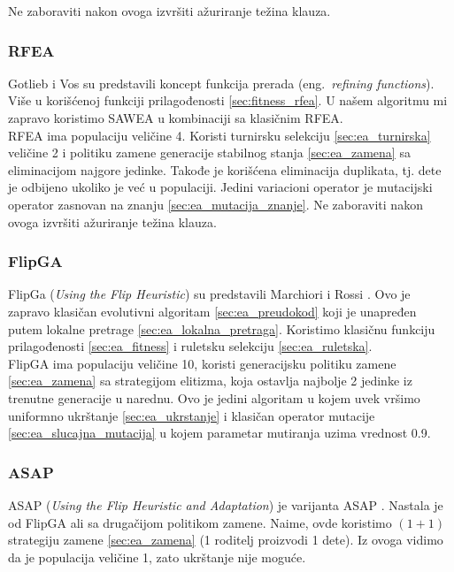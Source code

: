 \documentclass{article}
\begin{document}
Ne zaboraviti nakon ovoga izvršiti ažuriranje težina klauza.


\subsubsection{RFEA}
\label{sec:ea_rfea}
Gotlieb i Vos \cite{ea_with_table, ea_without_table} su predstavili koncept funkcija prerada (eng.~{\em refining functions}). Više u korišćenoj funkciji prilagođenosti \ref{sec:fitness_rfea}.
U našem algoritmu mi zapravo koristimo SAWEA u kombinaciji sa klasičnim RFEA. \\

RFEA ima populaciju veličine 4. Koristi turnirsku selekciju \ref{sec:ea_turnirska} veličine 2 i politiku zamene generacije stabilnog stanja \ref{sec:ea_zamena} sa eliminacijom najgore jedinke. Takođe je korišćena eliminacija duplikata, tj. dete je odbijeno ukoliko je već u populaciji.
Jedini variacioni operator je mutacijski operator zasnovan na znanju \ref{sec:ea_mutacija_znanje}.
Ne zaboraviti nakon ovoga izvršiti ažuriranje težina klauza.


\subsubsection{FlipGA}
\label{sec:ea_flipga}
FlipGa (\textit{Using the Flip Heuristic}) su predstavili Marchiori i Rossi \cite{ea_with_table}. Ovo je zapravo klasičan evolutivni algoritam \ref{sec:ea_preudokod}  koji je unapređen putem lokalne pretrage \ref{sec:ea_lokalna_pretraga}. Koristimo klasičnu funkciju prilagođenosti \ref{sec:ea_fitness} i ruletsku selekciju \ref{sec:ea_ruletska}. \\

FlipGA ima populaciju veličine 10, koristi generacijsku politiku zamene \ref{sec:ea_zamena} sa strategijom elitizma, koja ostavlja najbolje 2 jedinke iz trenutne generacije u narednu.	Ovo je jedini algoritam u kojem uvek vršimo uniformno ukrštanje \ref{sec:ea_ukrstanje} i klasičan operator mutacije \ref{sec:ea_slucajna_mutacija} u kojem parametar mutiranja uzima vrednost 0.9.
 
\subsubsection{ASAP}
\label{sec:ea_asap}
ASAP (\textit{Using the Flip Heuristic and Adaptation}) je varijanta ASAP \cite{ea_with_table}. Nastala je od FlipGA ali sa drugačijom politikom zamene. Naime, ovde koristimo
$(1+1)$ strategiju zamene \ref{sec:ea_zamena} (1 roditelj proizvodi 1 dete). Iz ovoga vidimo da je populacija veličine 1, zato ukrštanje nije moguće. \\
\end{document}
